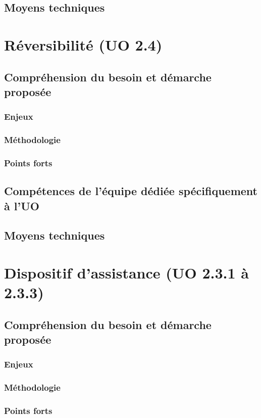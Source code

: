 	\subsection{Moyens techniques}
	
	\section{Réversibilité (UO 2.4)}
	\subsection{Compréhension du besoin et démarche proposée}
	\subsubsection{Enjeux}
	\subsubsection{Méthodologie}
	\subsubsection{Points forts}
	\subsection{Compétences de l'équipe dédiée spécifiquement à l'UO}	
	\subsection{Moyens techniques}
	
	\section{Dispositif d'assistance (UO 2.3.1 à 2.3.3)}
	\subsection{Compréhension du besoin et démarche proposée}
	\subsubsection{Enjeux}
	\subsubsection{Méthodologie}
	\subsubsection{Points forts}
